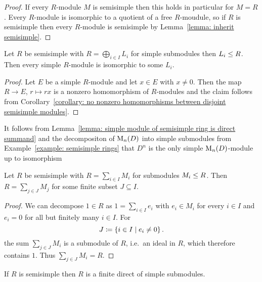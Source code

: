 \begin{proof}
  If every $R$-module $M$ is semisimple then this holds in particular for $M = R$.
  Every $R$-module is isomorphic to a quotient of a free $R$-moudule, so if $R$ is semisimple then every $R$-module is semisimple by Lemma~\ref{lemma: inherit semisimple}.
\end{proof}


\begin{lemma}
  \label{lemma: simple module of semisimple ring is direct summand}
  Let $R$ be semisimple with $R = \bigoplus_{i \in I} L_i$ for simple submodules then $L_i \leq R$.
  Then every simple $R$-module is isomorphic to some $L_i$.
\end{lemma}


\begin{proof}
  Let $E$ be a simple $R$-module and let $x \in E$ with $x \neq 0$.
  Then the map $R \to E$, $r \mapsto rx$ is a nonzero homomorphism of $R$-modules and the claim follows from Corollary~\ref{corollary: no nonzero homomorphisms between disjoint semisimple modules}.
\end{proof}


\begin{example}
  \label{example: D^n is the only simple M_n(D)-module}
  It follows from Lemma~\ref{lemma: simple module of semisimple ring is direct summand} and the decompositon of $\operatorname{M}_n(D)$ into simple submodules from Example~\ref{example: semisimple rings} that $D^n$ is the only simple $\operatorname{M}_n(D)$-module up to isomorphism
\end{example}


\begin{lemma}
  \label{lemma: ring is already finite sum of submodules}
  Let $R$ be semisimple with $R = \sum_{i \in I} M_i$ for submodules $M_i \leq R$.
  Then $R = \sum_{j \in J} M_j$ for some finite subset $J \subseteq I$.
\end{lemma}


\begin{proof}
  We can decompose $1 \in R$ as $1 = \sum_{i \in I} e_i$ with $e_i \in M_i$ for every $i \in I$ and $e_i = 0$ for all but finitely many $i \in I$.
  For
  \[
              J
    \coloneqq  \{ i \in I \mid e_i \neq 0 \} \,.
  \]
  the sum $\sum_{j \in J} M_i$ is a submodule of $R$, i.e.\ an ideal in $R$, which therefore contains $1$.
  Thus $\sum_{j \in J} M_i = R$.
\end{proof}


\begin{corollary}
  \label{corollary: semisimple ring is already a finite sum}
  If $R$ is semisimple then $R$ is a finite direct of simple submodules.
\end{corollary}


